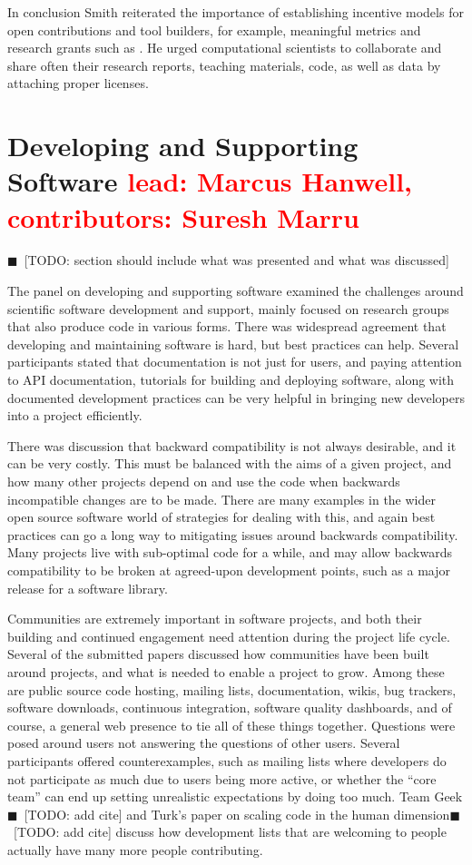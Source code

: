 \documentclass[11pt, oneside]{amsart}
\newcommand{\todo}[1]{{\color{blue}$\blacksquare$~\textsf{[TODO: #1]}}}
\newcommand{\note}[1]{ {\textcolor{red}    { #1 }}}
\begin{document}
In conclusion Smith reiterated the importance of establishing
incentive models for open contributions and tool builders, for
example, meaningful metrics and research grants such as
\cite{NSF_software_vision}. He urged computational scientists to
collaborate and share often their research reports, teaching
materials, code, as well as data by attaching proper licenses.

\section{Developing and Supporting Software \note{lead: Marcus Hanwell, contributors: Suresh Marru}} \label{sec:devel}

\todo{section should include what was presented and what was discussed}

The panel on developing and supporting software examined the challenges
around scientific software development and support, mainly focused on research
groups that also produce code in various forms. There was widespread agreement
that developing and maintaining software is hard, but best practices can help.
Several participants stated that documentation is not just for users, and paying attention
to API documentation, tutorials for building and deploying software, along with
documented development practices can be very helpful in bringing  new developers
into a project efficiently.

There was discussion that backward compatibility is not always desirable, and it
can be very costly. This must be balanced with the aims of a given project, and how
many other projects depend on and use the code when backwards incompatible
changes are to be made. There are many examples in the wider open source
software world of strategies for dealing with this, and again best practices
can go a long way to mitigating issues around backwards compatibility. Many
projects live with sub-optimal code for a while, and may allow backwards
compatibility to be broken at agreed-upon development points, such as a major
release for a software library.

Communities are extremely important in software projects, and both their
building and continued engagement need attention during the project life cycle.
Several of the submitted papers discussed how communities have been built around
projects, and what is needed to enable a project to grow. Among these are public
source code hosting, mailing lists, documentation, wikis, bug trackers, software
downloads, continuous integration, software quality dashboards, and of course,
a general web presence to tie all of these things together. Questions were posed
around users not answering the questions of other users. Several participants
offered counterexamples, such as mailing lists where developers do not participate
as much due to users being more active, or whether the ``core
team'' can end up setting unrealistic expectations by doing too much. Team Geek\todo{add cite}
and Turk's paper on scaling code in the human dimension\todo{add cite}  discuss how development
lists that are welcoming to people actually have many more people contributing.
\end{document}
